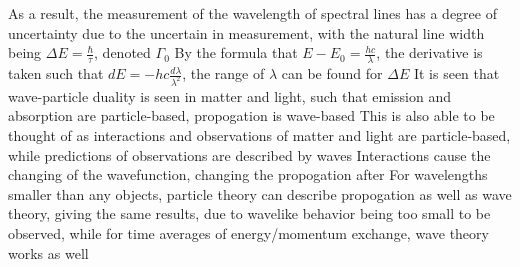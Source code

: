 \documentclass[11 pt, twoside]{article}
\newenvironment{outline*}
{
	\begin{outline}[enumerate]
	}
	{\end{outline}
}
\begin{document}
\begin{outline*}
		\3 As a result, the measurement of the wavelength of spectral lines has a degree of uncertainty due to the uncertain in measurement, with the natural line width being $\Delta E = \frac{\hbar}{\tau}$, denoted $\Gamma_0$
		\3 By the formula that $E - E_0 = \frac{hc}{\lambda}$, the derivative is taken such that $dE = -hc\frac{d\lambda}{\lambda^2}$, the range of $\lambda$ can be found for $\Delta E$
\1 It is seen that wave-particle duality is seen in matter and light, such that emission and absorption are particle-based, propogation is wave-based
	\2 This is also able to be thought of as interactions and observations of matter and light are particle-based, while predictions of observations are described by waves
		\3 Interactions cause the changing of the wavefunction, changing the propogation after
	\2 For wavelengths smaller than any objects, particle theory can describe propogation as well as wave theory, giving the same results, due to wavelike behavior being too small to be observed, while for time averages of energy/momentum exchange, wave theory works as well
\end{outline*}
\end{document}
